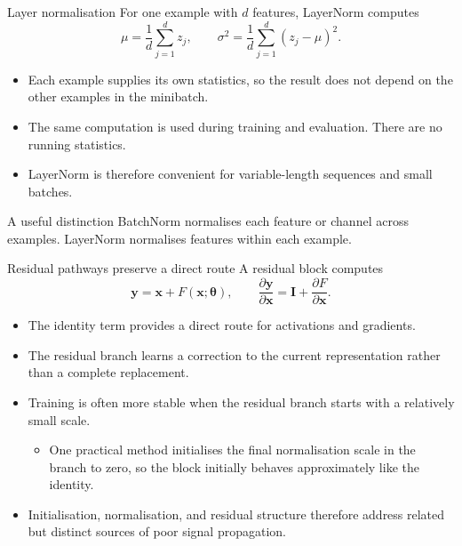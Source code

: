 
\begin{frame}{Layer normalisation}
For one example with $d$ features, LayerNorm computes
\[
  \mu=\frac{1}{d}\sum_{j=1}^{d}z_j,
  \qquad
  \sigma^2=\frac{1}{d}\sum_{j=1}^{d}(z_j-\mu)^2.
\]

\begin{itemize}
  \item Each example supplies its own statistics, so the result does not depend on the other examples in the minibatch.
  \item The same computation is used during training and evaluation. There are no running statistics.
  \item LayerNorm is therefore convenient for variable-length sequences and small batches.
\end{itemize}

\begin{block}{A useful distinction}
BatchNorm normalises each feature or channel across examples. LayerNorm normalises features within each example.
\end{block}
\end{frame}


\begin{frame}{Residual pathways preserve a direct route}
A residual block computes
\[
  \bm y=\bm x+F(\bm x;\bm\theta),
  \qquad
  \frac{\partial\bm y}{\partial\bm x}
  =\bm I+\frac{\partial F}{\partial\bm x}.
\]

\begin{itemize}
  \item The identity term provides a direct route for activations and gradients.
  \item The residual branch learns a correction to the current representation rather than a complete replacement.
  \item Training is often more stable when the residual branch starts with a relatively small scale.
  \begin{itemize}
    \item One practical method initialises the final normalisation scale in the branch to zero, so the block initially behaves approximately like the identity.
  \end{itemize}
  \item Initialisation, normalisation, and residual structure therefore address related but distinct sources of poor signal propagation.
\end{itemize}
\end{frame}

